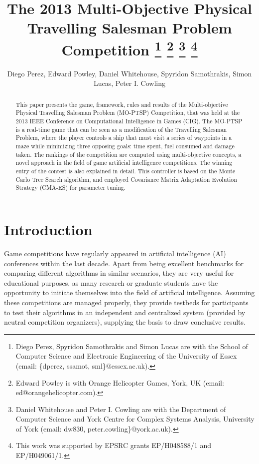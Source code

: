 \documentclass[conference]{IEEEtran}
\begin{document}
\title{The 2013 Multi-Objective Physical Travelling Salesman Problem Competition \thanks{Diego Perez, Spyridon Samothrakis and Simon Lucas are with the School of Computer Science and Electronic Engineering of the University of Essex (email: \{dperez, ssamot, sml\}@essex.ac.uk).} \thanks{Edward Powley is with Orange Helicopter Games, York, UK (email: ed@orangehelicopter.com).} \thanks{Daniel Whitehouse and Peter I. Cowling are with the Department of Computer Science and York Centre for Complex Systems Analysis, University of York (email:  \mbox{dw830}, \mbox{peter.cowling}\}@york.ac.uk).}  \thanks{This work was supported by EPSRC grants EP/H048588/1 and EP/H049061/1.}}

\author{Diego Perez, Edward Powley, Daniel Whitehouse, Spyridon Samothrakis, Simon Lucas, Peter I. Cowling}


\maketitle

\begin{abstract}
This paper presents the game, framework, rules and results of the Multi-objective Physical Travelling Salesman Problem (MO-PTSP) Competition, that was held at the 2013 IEEE Conference on Computational Intelligence in Games (CIG). The MO-PTSP is a real-time game that can be seen as a modification of the Travelling Salesman Problem, where the player controls a ship that must visit a series of waypoints in a maze while minimizing three opposing goals: time spent, fuel consumed and damage taken. The rankings of the competition are computed using multi-objective concepts, a novel approach in the field of game artificial intelligence competitions. The winning entry of the contest is also explained in detail. This controller is based on the Monte Carlo Tree Search algorithm, and employed Covariance Matrix Adaptation Evolution Strategy (CMA-ES) for parameter tuning. 
\end{abstract}


\section{Introduction}

Game competitions have regularly appeared in artificial intelligence (AI) conferences within the last decade. Apart from being excellent benchmarks for comparing different algorithms in similar scenarios, they are very useful for educational purposes, as many research or graduate students have the opportunity to initiate themselves into the field of artificial intelligence. Assuming these competitions are managed properly, they provide testbeds for participants to test their algorithms in an independent and centralized system (provided by neutral competition organizers), supplying the basis to draw conclusive results.
\end{document}
